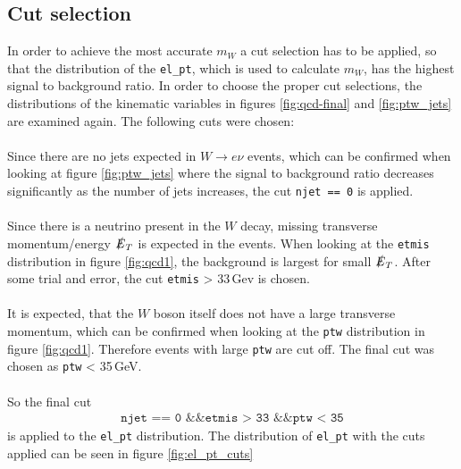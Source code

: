 \subsection{Cut selection}
    In order to achieve the most accurate $m_W$ a cut selection has to be applied, so that the distribution of the \texttt{el\_pt}, which is used to calculate $m_W$,
    has the highest signal to background ratio. In order to choose the proper cut selections, the distributions of the kinematic variables in figures \ref{fig:qcd-final}
    and \ref{fig:ptw_jets} are examined again. The following cuts were chosen:\\
    \\
    Since there are no jets expected in $W \rightarrow e\nu$ events, which can be confirmed when looking at figure \ref{fig:ptw_jets} where the signal to  
    background ratio decreases significantly as the number of jets increases, the cut \texttt{njet == 0} is applied.\\
    \\
    Since there is a neutrino present in the $W$ decay, missing transverse momentum/energy $\slashed{E}_T$ is expected in the events.
    When looking at the \texttt{etmis} distribution in figure \ref{fig:qcd1}, the background is largest for small $\slashed{E}_T$. After some trial and error, the cut
    \texttt{etmis} > 33\,Gev is chosen.\\
    \\
    It is expected, that the $W$ boson itself does not have a large transverse momentum, which can be confirmed when looking at the \texttt{ptw} distribution
    in figure \ref{fig:qcd1}. Therefore events with large \texttt{ptw} are cut off. The final cut was chosen as \texttt{ptw} < 35\,GeV.\\
    \\
    So the final cut 
    \begin{align*}
        \texttt{njet == 0 \&\& etmis > 33 \&\& ptw < 35}
    \end{align*}
    is applied to the \texttt{el\_pt} distribution. The distribution of \texttt{el\_pt} with the cuts applied can be seen in figure \ref{fig:el_pt_cuts}
